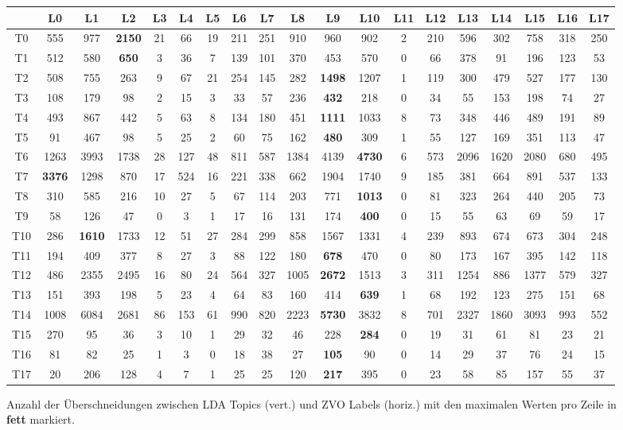\documentclass[german,version-2020-11]{uzl-thesis}
\begin{document}
\begin{figure}[H]
\begin{center}
\tiny
\renewcommand{\arraystretch}{2}
\begin{tabular}{ccccccccccccccccccc}
\hline
\hline 
&L0&L1&L2&L3&L4&L5&L6&L7&L8&L9&L10&L11&L12&L13&L14&L15&L16&L17\\
\hline
\hline
T0&555& 977& \textbf{2150}& 21& 66& 19& 211& 251& 910& 960& 902& 2& 210& 596& 302& 758& 318& 250\\
\hline 
T1&512& 580& \textbf{650}& 3& 36& 7& 139& 101& 370& 453& 570& 0& 66& 378& 91& 196& 123& 53\\
\hline 
T2&508& 755& 263& 9& 67& 21& 254& 145& 282& \textbf{1498}& 1207& 1& 119& 300& 479& 527& 177& 130\\
\hline 
T3&108& 179& 98& 2& 15& 3& 33& 57& 236& \textbf{432}& 218& 0& 34& 55& 153& 198& 74& 27\\
\hline 
T4&493& 867& 442& 5& 63& 8& 134& 180& 451& \textbf{1111}& 1033& 8& 73& 348& 446& 489& 191& 89\\
\hline 
T5&91& 467& 98& 5& 25& 2& 60& 75& 162& \textbf{480}& 309& 1& 55& 127& 169& 351& 113& 47\\
\hline 
T6&1263& 3993& 1738& 28& 127& 48& 811& 587& 1384& 4139& \textbf{4730}& 6& 573& 2096& 1620& 2080& 680& 495\\
\hline 
T7&\textbf{3376}& 1298& 870& 17& 524& 16& 221& 338& 662& 1904& 1740& 9& 185& 381& 664& 891& 537& 133\\
\hline 
T8&310& 585& 216& 10& 27& 5& 67& 114& 203& 771 & \textbf{1013}& 0& 81& 323& 264& 440& 205& 73\\
\hline 
T9&58& 126& 47& 0& 3& 1& 17& 16& 131& 174& \textbf{400}& 0& 15& 55& 63& 69& 59& 17\\
\hline 
T10&286& \textbf{1610}& 1733& 12& 51& 27& 284& 299& 858& 1567& 1331& 4& 239& 893& 674& 673& 304& 248\\
\hline 
T11&194& 409& 377& 8& 27& 3& 88& 122& 180& \textbf{678}& 470& 0& 80& 173& 167& 395& 142& 118\\
\hline 
T12&486& 2355& 2495& 16& 80& 24& 564& 327& 1005& \textbf{2672}& 1513& 3& 311& 1254& 886& 1377& 579& 327\\
\hline 
T13&151& 393& 198& 5& 23& 4& 64& 83& 160& 414& \textbf{639}& 1& 68& 192& 123& 275& 151& 68\\
\hline 
T14&1008& 6084& 2681& 86& 153& 61& 990& 820& 2223& \textbf{5730}& 3832& 8& 701& 2327& 1860& 3093& 993& 552\\
\hline 
T15&270& 95& 36& 3& 10& 1& 29& 32& 46& 228& \textbf{284}& 0& 19& 31& 61& 81& 23& 21\\
\hline 
T16&81& 82& 25& 1& 3& 0& 18& 38& 27& \textbf{105}& 90& 0& 14& 29& 37& 76& 24& 15\\
\hline
T17&20& 206& 128& 4& 7& 1& 25& 25& 120& \textbf{217}& 395& 0& 23& 58& 85& 157& 55& 37\\
\hline
\hline
\end{tabular}
\caption{Anzahl der Überschneidungen zwischen LDA Topics (vert.) und ZVO Labels (horiz.) mit den maximalen Werten pro Zeile in \textbf{fett} markiert.}
\label{fig:matrixnormal}
\end{center}
\end{figure}
\end{document}

